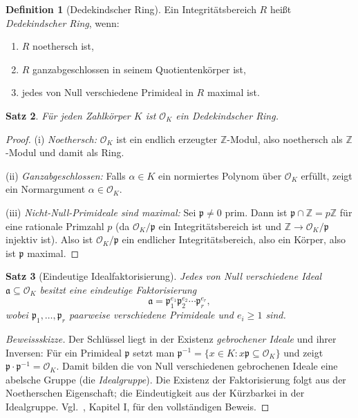 \documentclass[12pt,a4paper]{amsart}
\newtheorem{theorem}{Satz}[section]
\theoremstyle{definition}
\newtheorem{definition}[theorem]{Definition}
\newcommand{\Z}{\mathbb{Z}}
\newcommand{\OK}{\mathcal{O}_K}
\newcommand{\p}{\mathfrak{p}}
\newcommand{\aaa}{\mathfrak{a}}
\begin{document}
\begin{definition}[Dedekindscher Ring]
\label{def:dedekind}
Ein Integritätsbereich $R$ heißt \emph{Dedekindscher Ring}, wenn:
\begin{enumerate}[label=(\roman*)]
  \item $R$ noethersch ist,
  \item $R$ ganzabgeschlossen in seinem Quotientenkörper ist,
  \item jedes von Null verschiedene Primideal in $R$ maximal ist.
\end{enumerate}
\end{definition}

\begin{theorem}
\label{thm:OK_dedekind}
Für jeden Zahlkörper $K$ ist $\OK$ ein Dedekindscher Ring.
\end{theorem}

\begin{proof}
(i) \emph{Noethersch:} $\OK$ ist ein endlich erzeugter $\Z$-Modul,
also noethersch als $\Z$-Modul und damit als Ring.

(ii) \emph{Ganzabgeschlossen:} Falls $\alpha \in K$ ein normiertes Polynom
über $\OK$ erfüllt, zeigt ein Normargument $\alpha \in \OK$.

(iii) \emph{Nicht-Null-Primideale sind maximal:} Sei $\p \ne 0$ prim.
Dann ist $\p \cap \Z = p\Z$ für eine rationale Primzahl $p$ (da $\OK/\p$
ein Integritätsbereich ist und $\Z \to \OK/\p$ injektiv ist).
Also ist $\OK/\p$ ein endlicher Integritätsbereich, also ein Körper,
also ist $\p$ maximal.
\end{proof}

\begin{theorem}[Eindeutige Idealfaktorisierung]
\label{thm:ufid}
Jedes von Null verschiedene Ideal $\aaa \subseteq \OK$ besitzt eine
eindeutige Faktorisierung
\[
  \aaa = \p_1^{e_1} \p_2^{e_2} \cdots \p_r^{e_r},
\]
wobei $\p_1, \ldots, \p_r$ paarweise verschiedene Primideale und $e_i \ge 1$ sind.
\end{theorem}

\begin{proof}[Beweissskizze]
Der Schlüssel liegt in der Existenz \emph{gebrochener Ideale} und ihrer
Inversen: Für ein Primideal $\p$ setzt man
$\p^{-1} = \{x \in K : x\p \subseteq \OK\}$ und zeigt $\p \cdot \p^{-1} = \OK$.
Damit bilden die von Null verschiedenen gebrochenen Ideale eine abelsche
Gruppe (die \emph{Idealgruppe}).  Die Existenz der Faktorisierung folgt
aus der Noetherschen Eigenschaft; die Eindeutigkeit aus der Kürzbarkei
in der Idealgruppe.  Vgl.\ \cite{Neukirch1999}, Kapitel I, für den
vollständigen Beweis.
\end{proof}
\end{document}
